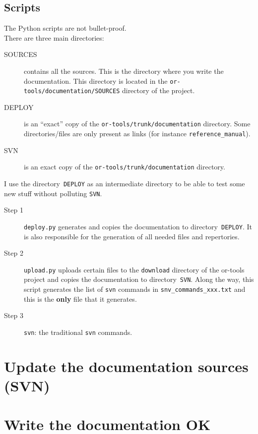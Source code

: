 \documentclass[a4paper,10pt]{article}
\begin{document}
\subsection{Scripts}
The Python scripts are not bullet-proof.\\

There are three main directories:
\begin{description}
 \item[SOURCES] contains all the sources. This is the directory where you write the documentation. This directory is located in the \verb+or-tools/documentation/SOURCES+ directory of the project.
 \item[DEPLOY] is an ``exact'' copy of the \verb+or-tools/trunk/documentation+ directory. Some directories/files are only present as links (for instance \verb+reference_manual+).
 \item[SVN] is an exact copy of the \verb+or-tools/trunk/documentation+ directory.
 \end{description}

I use the directory~\verb+DEPLOY+ as an intermediate directory to be able to test some new stuff without polluting \verb+SVN+.\\



\begin{description}
 \item[Step 1] \verb+deploy.py+ generates and copies the documentation to directory~\verb+DEPLOY+. It is also responsible for the generation of all needed files and repertories.
 \item[Step 2] \verb+upload.py+ uploads certain files to the \verb+download+ directory of the or-tools project and copies the documentation to directory~\verb+SVN+. Along the way, this script generates the list of
	       \verb+svn+ commands in \verb+snv_commands_xxx.txt+ and this is the \textbf{only} file that it generates.
 \item[Step 3] \verb+svn+: the traditional \verb+svn+ commands.
 \end{description}

\section{Update the documentation sources (SVN)}
\label{update_source_code}

\section{Write the documentation OK}
\label{write_documentation}
\end{document}
